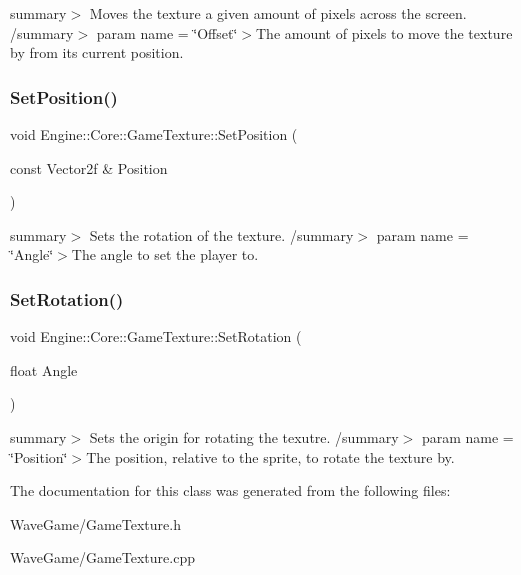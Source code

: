 summary$>$ Moves the texture a given amount of pixels across the screen. /summary$>$ param name = \char`\"{}\+Offset\char`\"{}$>$The amount of pixels to move the texture by from its current position.\mbox{\label{class_engine_1_1_core_1_1_game_texture_ae1f94e0f1b86e99ed4508ccdda4872d6}} 
\subsubsection{\texorpdfstring{Set\+Position()}{SetPosition()}}
{\footnotesize\ttfamily void Engine\+::\+Core\+::\+Game\+Texture\+::\+Set\+Position (\begin{DoxyParamCaption}\item[{const Vector2f \&}]{Position }\end{DoxyParamCaption})}

summary$>$ Sets the rotation of the texture. /summary$>$ param name = \char`\"{}\+Angle\char`\"{}$>$The angle to set the player to.\mbox{\label{class_engine_1_1_core_1_1_game_texture_a5ed78714df6128f09c35c25e2271dc05}} 
\subsubsection{\texorpdfstring{Set\+Rotation()}{SetRotation()}}
{\footnotesize\ttfamily void Engine\+::\+Core\+::\+Game\+Texture\+::\+Set\+Rotation (\begin{DoxyParamCaption}\item[{float}]{Angle }\end{DoxyParamCaption})}

summary$>$ Sets the origin for rotating the texutre. /summary$>$ param name = \char`\"{}\+Position\char`\"{}$>$The position, relative to the sprite, to rotate the texture by.

The documentation for this class was generated from the following files\+:\begin{DoxyCompactItemize}
\item 
Wave\+Game/Game\+Texture.\+h\item 
Wave\+Game/Game\+Texture.\+cpp\end{DoxyCompactItemize}
